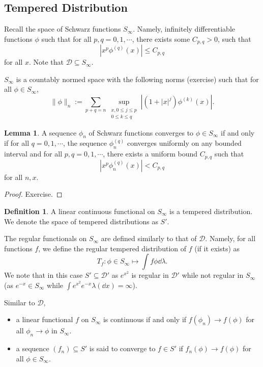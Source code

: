 \documentclass[]{article}
\theoremstyle{definition}
\theoremstyle{definition}
\newtheorem{definition}{Definition}[section]
\newtheorem{lemma}{Lemma}[section]
\begin{document}
\subsection{Tempered Distribution}

Recall the space of Schwarz functions \(S_\infty\). Namely, infinitely 
differentiable functions \(\phi\) such that for all \(p, q = 0, 1, \cdots\), 
there exists some \(C_{p, q} > 0\), such that
\[|x^p \phi^{(q)}(x)| \le C_{p, q}\] 
for all \(x\). Note that \(\mathcal{D} \subseteq S_\infty\).

\(S_\infty\) is a countably normed space with the following norms (exercise)
such that for all \(\phi \in S_\infty\),
\[\|\phi\|_n := \sum_{p + q = n} \sup_{\substack{x, 0 \le j \le p\\0 \le k \le q}}
|(1 + |x|^j)\phi^{(k)}(x)|.\] 

\begin{lemma}
  A sequence \(\phi_n\) of Schwarz functions converges to \(\phi \in S_\infty\) 
  if and only if for all \(q = 0, 1, \cdots\), the sequence \(\phi_n^{(q)}\) converges 
  uniformly on any bounded interval and for all \(p, q = 0, 1, \cdots\), 
  there exists a uniform bound \(C_{p, q}\) such that 
  \[|x^p \phi_n^{(q)}(x)| < C_{p, q}\]
  for all \(n, x\).
\end{lemma}
\begin{proof}
  Exercise.
\end{proof}

\begin{definition}
  A linear continuous functional on \(S_\infty\) is a tempered distribution.
  We denote the space of tempered distributions as \(S'\).
\end{definition}

The regular functionals on \(S_\infty\) are defined similarly to that of 
\(\mathcal{D}\). Namely, for all functions \(f\), we define the regular tempered 
distribution of \(f\) (if it exists) as 
\[T_f : \phi \in S_\infty \mapsto \int f\phi \dd \lambda.\]
We note that in this case \(S' \subseteq \mathcal{D}'\) as \(e^{x^2}\) 
is regular in \(\mathcal{D}'\) while not regular in \(S_\infty\) 
(as \(e^{-x} \in S_\infty\) while \(\int e^{x^2} e^{-x} \lambda(\dd x) = \infty\)).

Similar to \(\mathcal{D}\), 
\begin{itemize}
  \item a linear functional \(f\) on \(S_\infty\) is continuous if and only if 
  \(f(\phi_n) \to f(\phi)\) for all \(\phi_n \to \phi\) in \(S_\infty\).
  \item a sequence \((f_n) \subseteq S'\) is said to converge to \(f \in S'\) 
  if \(f_n(\phi) \to f(\phi)\) for all \(\phi \in S_\infty\).
\end{itemize}
\end{document}
